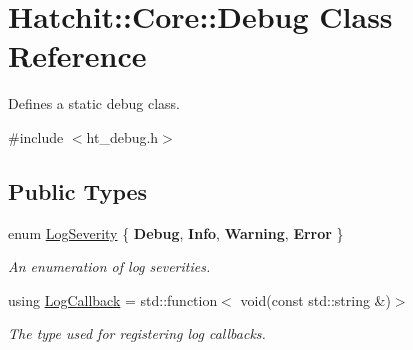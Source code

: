 \hypertarget{classHatchit_1_1Core_1_1Debug}{}\section{Hatchit\+:\+:Core\+:\+:Debug Class Reference}
\label{classHatchit_1_1Core_1_1Debug}


Defines a static debug class.  




{\ttfamily \#include $<$ht\+\_\+debug.\+h$>$}

\subsection*{Public Types}
\begin{DoxyCompactItemize}
\item 
enum \hyperlink{classHatchit_1_1Core_1_1Debug_a2a42bf8bcfbf6a7f8ec8f22c65470a37}{Log\+Severity} \{ {\bfseries Debug}, 
{\bfseries Info}, 
{\bfseries Warning}, 
{\bfseries Error}
 \}\hypertarget{classHatchit_1_1Core_1_1Debug_a2a42bf8bcfbf6a7f8ec8f22c65470a37}{}\label{classHatchit_1_1Core_1_1Debug_a2a42bf8bcfbf6a7f8ec8f22c65470a37}
\begin{DoxyCompactList}\small\item\em An enumeration of log severities. \end{DoxyCompactList}
\item 
using \hyperlink{classHatchit_1_1Core_1_1Debug_a0e7951bf02ef93ff3cd4eb9b7d3d4edb}{Log\+Callback} = std\+::function$<$ void(const std\+::string \&)$>$\hypertarget{classHatchit_1_1Core_1_1Debug_a0e7951bf02ef93ff3cd4eb9b7d3d4edb}{}\label{classHatchit_1_1Core_1_1Debug_a0e7951bf02ef93ff3cd4eb9b7d3d4edb}

\begin{DoxyCompactList}\small\item\em The type used for registering log callbacks. \end{DoxyCompactList}\end{DoxyCompactItemize}
